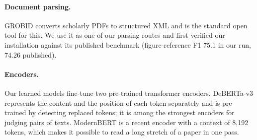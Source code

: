 \paragraph{Document parsing.} GROBID \citep{lopez2009grobid} converts scholarly PDFs to structured XML and is
the standard open tool for this. We use it as one of our parsing routes and first verified our installation
against its published benchmark (figure-reference F1 75.1 in our run, 74.26 published).

\paragraph{Encoders.} Our learned models fine-tune two pre-trained transformer encoders. DeBERTa-v3
\citep{he2021deberta,he2023debertav3} represents the content and the position of each token separately and is
pre-trained by detecting replaced tokens; it is among the strongest encoders for judging pairs of texts.
ModernBERT \citep{warner2024modernbert} is a recent encoder with a context of 8{,}192 tokens, which makes it
possible to read a long stretch of a paper in one pass.
